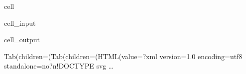 \documentclass[letterpaper,10pt,english]{jupyterBook}
\begin{document}
\begin{sphinxuseclass}{cell}\begin{sphinxVerbatimInput}

\begin{sphinxuseclass}{cell_input}
\begin{sphinxVerbatim}[commandchars=\\\{\}]
    \PYG{p}{[} \PYG{p}{]}
\end{sphinxVerbatim}

\end{sphinxuseclass}\end{sphinxVerbatimInput}
\begin{sphinxVerbatimOutput}

\begin{sphinxuseclass}{cell_output}
\begin{sphinxVerbatim}[commandchars=\\\{\}]
Tab(children=(Tab(children=(HTML(value=\PYGZsq{}\PYGZlt{}?xml version=\PYGZdq{}1.0\PYGZdq{} encoding=\PYGZdq{}utf\PYGZhy{}8\PYGZdq{} standalone=\PYGZdq{}no\PYGZdq{}?\PYGZgt{}\PYGZbs{}n\PYGZlt{}!DOCTYPE svg …
\end{sphinxVerbatim}

\begin{sphinxVerbatim}[commandchars=\\\{\}]

\end{sphinxVerbatim}

\end{sphinxuseclass}\end{sphinxVerbatimOutput}

\end{sphinxuseclass}
\end{document}
